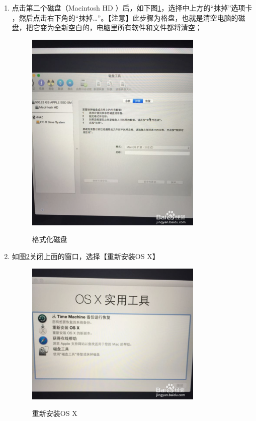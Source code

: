 \documentclass{article}
\begin{document}
\begin{enumerate}
\item 点击第二个磁盘（Macintosh HD ）后，如下图\ref{modiao}，选择中上方的“抹掉”选项卡 ，然后点击右下角的“抹掉…”。【注意】此步骤为格盘，也就是清空电脑的磁盘，把它变为全新空白的，电脑里所有软件和文件都将清空；
 \begin{figure}[!htb] %
 \centering
 \includegraphics[width=0.8\textwidth]{figures/modiao.png}
 \label{modiao}
 \caption{格式化磁盘}
 \end{figure}

\item 如图\ref{jixu}关闭上面的窗口，选择【重新安装OS X】
 \begin{figure}[!htb] %
 \centering
 \includegraphics[width=0.8\textwidth]{figures/cipangongju.png}
 \label{jixu}
 \caption{重新安装OS X}
 \end{figure}


\end{enumerate}
\end{document}
